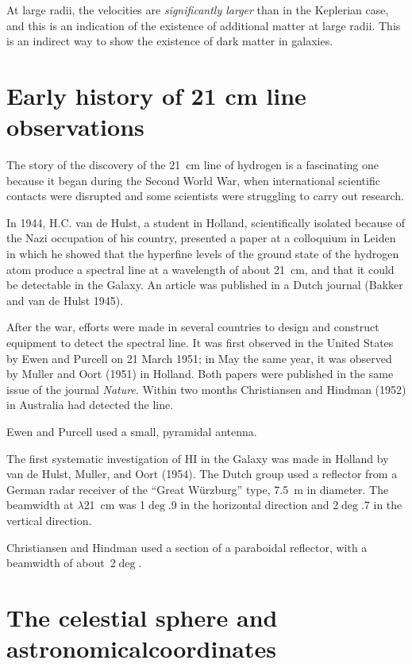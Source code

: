 At large radii, the velocities are {\it significantly larger} than in
the Keplerian case, and this is an indication of the existence of
additional matter at large radii. This is an indirect way to show the
existence of dark matter in galaxies.

\chapter{Early history of 21 cm line observations}\label{app-history}

The story of the discovery of the 21~cm line of hydrogen is a
fascinating one because it began during the Second World War, when
international scientific contacts were disrupted and some scientists
were struggling to carry out research.

In 1944, H.C. van de Hulst, a student in Holland, scientifically
isolated because of the Nazi occupation of his country, presented a
paper at a colloquium in Leiden in which he showed that the hyperfine
levels of the ground state of the hydrogen atom produce a spectral
line at a wavelength of about 21~cm, and that it could be detectable
in the Galaxy.  An article was published in a Dutch journal (Bakker
and van de Hulst 1945).

After the war, efforts were made in several countries to design and
construct equipment to detect the spectral line. It was first observed
in the United States by Ewen and Purcell on 21 March 1951; in May the
same year, it was observed by Muller and Oort (1951) in Holland. Both
papers were published in the same issue of the journal {\it Nature}.
Within two months Christiansen and Hindman (1952) in Australia had
detected the line.

Ewen and Purcell used a small, pyramidal antenna.

The first systematic investigation of HI in the Galaxy was made in
Holland by van de Hulst, Muller, and Oort (1954).  The Dutch group
used a reflector from a German radar receiver of the ``Great
W\"urzburg'' type, 7.5~m in diameter.  The beamwidth at $\lambda$21~cm
was 1$\deg$.9 in the horizontal direction and 2$\deg$.7 in the
vertical direction.

Christiansen and Hindman used a section of a paraboidal reflector,
with a beamwidth of about~2$\deg$.


\chapter{The celestial sphere and astronomicalcoordinates}
\label{appcoord}

